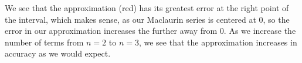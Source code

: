 \documentclass[letterpaper,10pt]{article}
\begin{document}
\begin{enumerate}
\begin{center}
\end{center}
We see that the approximation (red) has its greatest error at the right point of the interval, which makes sense, as our Maclaurin series is centered at $0$, so the error in our approximation increases the further away from $0$. As we increase the number of terms from $n=2$ to $n=3$, we see that the approximation increases in accuracy as we would expect.
\end{enumerate}
\end{document}
